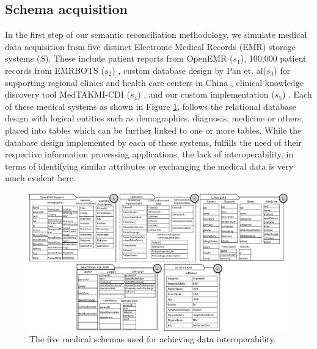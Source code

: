 \documentclass{ieeeaccess}
\begin{document}
\subsection{Schema acquisition}
\label{schema_acq}
In the first step of our semantic reconciliation methodology, we simulate medical data acquisition from five distinct Electronic Medical Records (EMR) storage systems ($S$). These include patient reports from OpenEMR ($s_1$), 100,000 patient records from EMRBOTS ($s_2$) \cite{kartoun2016methodology}, custom database design by Pan et. al($s_3$) for supporting regional clinics and health care centers in China \cite{pan2016design}, clinical knowledge discovery tool MedTAKMI-CDI ($s_4$) \cite{inokuchi2007medtakmi}, and our custom implementation ($s_5$) \cite{ali2017reconciliation}. Each of these medical systems as shown in Figure \ref{fig:schema}, follows the relational database design with logical entities such as demographics, diagnosis, medicine or others, placed into tables which can be further linked to one or more tables. While the database design implemented by each of these systems, fulfills the need of their respective information processing applications, the lack of interoperability, in terms of identifying similar attributes or exchanging the medical data is very much evident here. 


\begin{figure}[t!]
	\centering
	\includegraphics[scale=0.53]{schemas}
	\caption{The five medical schemas used for achieving data interoperability.}
	\label{fig:schema}
\end{figure} 
\end{document}
